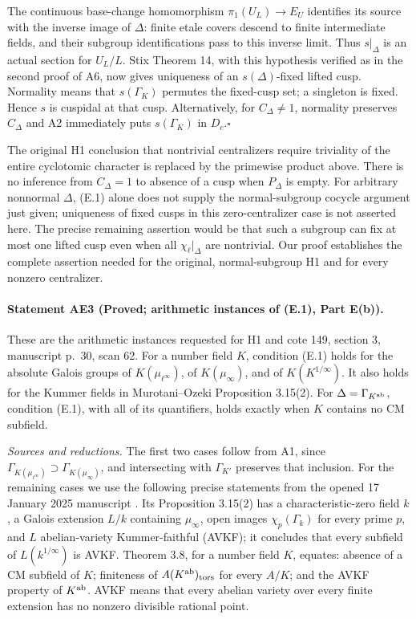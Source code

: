 The continuous base-change homomorphism $\pi_1(U_L)\to E_U$ identifies its source with the inverse image of $\Delta$: finite etale covers descend to finite intermediate fields, and their subgroup identifications pass to this inverse limit. Thus $s|_\Delta$ is an actual section for $U_L/L$. Stix Theorem 14, with this hypothesis verified as in the second proof of A6, now gives uniqueness of an $s(\Delta)$-fixed lifted cusp. Normality means that $s(\Gamma_K)$ permutes the fixed-cusp set; a singleton is fixed. Hence $s$ is cuspidal at that cusp. Alternatively, for $C_\Delta\ne1$, normality preserves $C_\Delta$ and A2 immediately puts $s(\Gamma_K)$ in $D_c$.\hfill$\square$

The original H1 conclusion that nontrivial centralizers require triviality of the entire cyclotomic character is replaced by the primewise product above. There is no inference from $C_\Delta=1$ to absence of a cusp when $P_\Delta$ is empty. For arbitrary nonnormal $\Delta$, (E.1) alone does not supply the normal-subgroup cocycle argument just given; uniqueness of fixed cusps in this zero-centralizer case is not asserted here. The precise remaining assertion would be that such a subgroup can fix at most one lifted cusp even when all $\chi_\ell|_\Delta$ are nontrivial. Our proof establishes the complete assertion needed for the original, normal-subgroup H1 and for every nonzero centralizer.

\paragraph{Statement AE3 (Proved; arithmetic instances of (E.1), Part E(b)).}\label{res:AE3}
These are the arithmetic instances requested for H1 and cote 149, section 3, manuscript p.~30, scan 62.
For a number field $K$, condition (E.1) holds for the absolute Galois groups of $K(\mu_{\ell^\infty})$, of $K(\mu_\infty)$, and of $K(K^{1/\infty})$. It also holds for the Kummer fields in Murotani--Ozeki Proposition 3.15(2). For $\Delta=\Gamma_{K^{\rm ab}}$, condition (E.1), with all of its quantifiers, holds exactly when $K$ contains no CM subfield.

\emph{Sources and reductions.} The first two cases follow from A1, since $\Gamma_{K(\mu_{\ell^\infty})}\supset\Gamma_{K(\mu_\infty)}$, and intersecting with $\Gamma_{K'}$ preserves that inclusion. For the remaining cases we use the following precise statements from the opened 17 January 2025 manuscript \cite{MurotaniOzeki2025}. Its Proposition 3.15(2) has a characteristic-zero field $k$, a Galois extension $L/k$ containing $\mu_\infty$, open images $\chi_p(\Gamma_k)$ for every prime $p$, and $L$ abelian-variety Kummer-faithful (AVKF); it concludes that every subfield of $L(k^{1/\infty})$ is AVKF. Theorem 3.8, for a number field $K$, equates: absence of a CM subfield of $K$; finiteness of $A(K^{\rm ab})_{\rm tors}$ for every $A/K$; and the AVKF property of $K^{\rm ab}$. AVKF means that every abelian variety over every finite extension has no nonzero divisible rational point.

